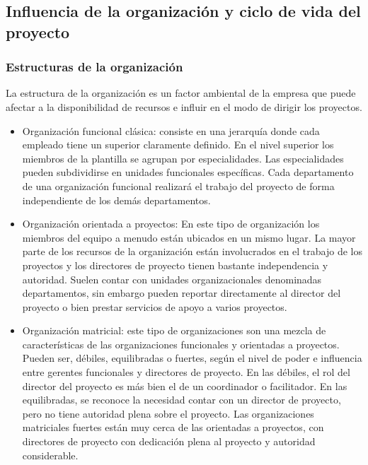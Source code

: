 \newpage{}
\subsection{Influencia de la organización y ciclo de vida del proyecto}

\subsubsection{Estructuras de la organización}

La estructura de la organización es un factor ambiental de la empresa que puede afectar a la disponibilidad de recursos e influir en el modo de dirigir los proyectos.

\begin{itemize}
\item{Organización funcional clásica: consiste en una jerarquía donde cada empleado tiene un superior claramente definido. En el nivel superior los miembros de la plantilla se agrupan por especialidades. Las especialidades pueden subdividirse en unidades funcionales específicas. Cada departamento de una organización funcional realizará el trabajo del proyecto de forma independiente de los demás departamentos. }

\item{Organización orientada a proyectos: En este tipo de organización los miembros del equipo a menudo están ubicados en un mismo lugar. La mayor parte de los recursos de la organización están involucrados en el trabajo de los proyectos y los directores de proyecto tienen bastante independencia y autoridad. Suelen contar con unidades organizacionales denominadas departamentos, sin embargo pueden reportar directamente al director del proyecto o bien prestar servicios de apoyo a varios proyectos.}

\item{Organización matricial: este tipo de organizaciones son una mezcla de características de las organizaciones funcionales y orientadas a proyectos. Pueden ser, débiles, equilibradas o fuertes, según el nivel de poder e influencia entre gerentes funcionales y directores de proyecto. En las débiles, el rol del director del proyecto es más bien el de un coordinador o facilitador. En las equilibradas, se reconoce la necesidad contar con un director de proyecto, pero no tiene autoridad plena sobre el proyecto. Las organizaciones matriciales fuertes están muy cerca de las orientadas a proyectos, con directores de proyecto con dedicación plena al proyecto y autoridad considerable.}

\end{itemize}

